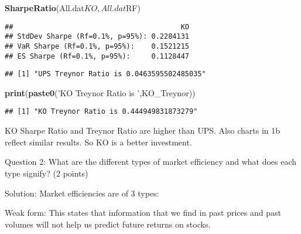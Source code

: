 \documentclass[]{article}
\newenvironment{Shaded}{\begin{snugshade}}{\end{snugshade}}
\newcommand{\KeywordTok}[1]{\textcolor[rgb]{0.13,0.29,0.53}{\textbf{{#1}}}}
\newcommand{\StringTok}[1]{\textcolor[rgb]{0.31,0.60,0.02}{{#1}}}
\newcommand{\NormalTok}[1]{{#1}}
\begin{document}
\begin{Shaded}
\begin{Highlighting}[]
\KeywordTok{SharpeRatio}\NormalTok{(All.dat$KO,All.dat$RF)}
\end{Highlighting}
\end{Shaded}

\begin{verbatim}
##                                        KO
## StdDev Sharpe (Rf=0.1%, p=95%): 0.2284131
## VaR Sharpe (Rf=0.1%, p=95%):    0.1521215
## ES Sharpe (Rf=0.1%, p=95%):     0.1128447
\end{verbatim}

\begin{Shaded}
\end{Shaded}

\begin{verbatim}
## [1] "UPS Treynor Ratio is 0.0463595502485035"
\end{verbatim}

\begin{Shaded}
\begin{Highlighting}[]
\KeywordTok{print}\NormalTok{(}\KeywordTok{paste0}\NormalTok{(}\StringTok{'KO Treynor Ratio is '}\NormalTok{,KO_Treynor))}
\end{Highlighting}
\end{Shaded}

\begin{verbatim}
## [1] "KO Treynor Ratio is 0.444949831873279"
\end{verbatim}

KO Sharpe Ratio and Treynor Ratio are higher than UPS. Also charts in 1b
reflect similar results. So KO is a better investment.

Question 2: What are the different types of market efficiency and what
does each type signify? (2 points)

Solution: Market efficiencies are of 3 types:

Weak form: This states that information that we find in past prices and
past volumes will not help us predict future returns on stocks.
\end{document}

